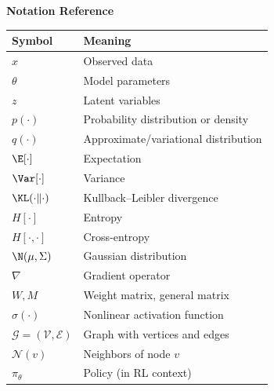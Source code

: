 \vspace*{1cm}
{\noindent\LARGE\bfseries Notation Reference\par}
\vspace{0.8cm}

\begin{center}
\begin{tabular}{@{}ll@{}}
\toprule
\textbf{Symbol} & \textbf{Meaning} \\
\midrule
$x$ & Observed data \\
$\theta$ & Model parameters \\
$z$ & Latent variables \\
$p(\cdot)$ & Probability distribution or density \\
$q(\cdot)$ & Approximate/variational distribution \\
$\E[\cdot]$ & Expectation \\
$\Var[\cdot]$ & Variance \\
$\KL(\cdot \| \cdot)$ & Kullback--Leibler divergence \\
$H[\cdot]$ & Entropy \\
$H[\cdot, \cdot]$ & Cross-entropy \\
$\N(\mu, \Sigma)$ & Gaussian distribution \\
$\nabla$ & Gradient operator \\
$W, M$ & Weight matrix, general matrix \\
$\sigma(\cdot)$ & Nonlinear activation function \\
$\mathcal{G} = (\mathcal{V}, \mathcal{E})$ & Graph with vertices and edges \\
$\mathcal{N}(v)$ & Neighbors of node $v$ \\
$\pi_{\theta}$ & Policy (in RL context) \\
\bottomrule
\end{tabular}
\end{center}
